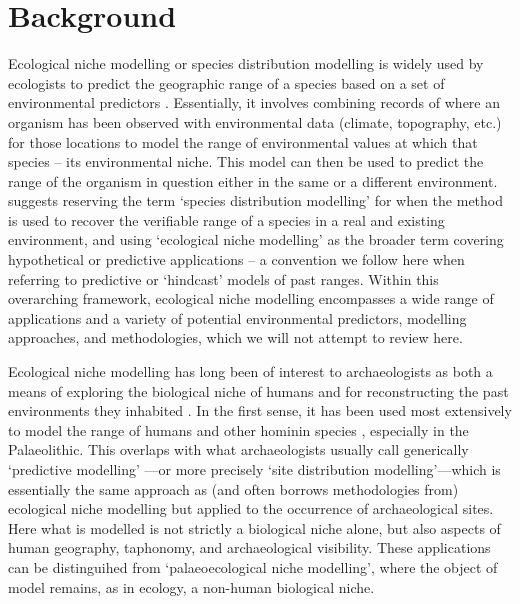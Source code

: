 \documentclass[
  authoryear,
  preprint]{elsarticle}
\begin{document}
\section{Background}\label{background}

Ecological niche modelling or species distribution modelling is widely
used by ecologists to predict the geographic range of a species based on
a set of environmental predictors \citep{FranklinMiller2009}.
Essentially, it involves combining records of where an organism has been
observed with environmental data (climate, topography, etc.) for those
locations to model the range of environmental values at which that
species -- its environmental niche. This model can then be used to
predict the range of the organism in question either in the same or a
different environment. \citet{TownsendPetersonSoberon2012} suggests
reserving the term `species distribution modelling' for when the method
is used to recover the verifiable range of a species in a real and
existing environment, and using `ecological niche modelling' as the
broader term covering hypothetical or predictive applications -- a
convention we follow here when referring to predictive or `hindcast'
models of past ranges. Within this overarching framework, ecological
niche modelling encompasses a wide range of applications and a variety
of potential environmental predictors, modelling approaches, and
methodologies, which we will not attempt to review here.

Ecological niche modelling has long been of interest to archaeologists
as both a means of exploring the biological niche of humans and for
reconstructing the past environments they inhabited
\citep{DavidPollyEronen2011, FranklinEtAl2015}. In the first sense, it
has been used most extensively to model the range of humans and other
hominin species
\citep[e.g.][]{BenitoEtAl2017, YousefiEtAl2020, BanksEtAl2021, YaworskyEtAl2024a, YaworskyEtAl2024b, GuranEtAl2024},
especially in the Palaeolithic. This overlaps with what archaeologists
usually call generically `predictive modelling'
\citep{VerhagenWhitley2020}---or more precisely `site distribution
modelling'---which is essentially the same approach as (and often
borrows methodologies from) ecological niche modelling but applied to
the occurrence of archaeological sites. Here what is modelled is not
strictly a biological niche alone, but also aspects of human geography,
taphonomy, and archaeological visibility. These applications can be
distinguihed from `palaeoecological niche modelling', where the object
of model remains, as in ecology, a non-human biological niche.
\end{document}

